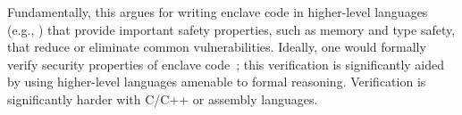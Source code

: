Fundamentally, this argues for writing enclave code in higher-level languages
(e.g., \java{}) that provide important 
safety properties, such as memory and type safety, that reduce or eliminate common vulnerabilities.
Ideally, one would formally verify security properties of enclave code~\citep{moat}; this verification is significantly aided by using 
higher-level languages amenable to formal reasoning.  Verification is significantly harder
with C/C++ or assembly languages.









